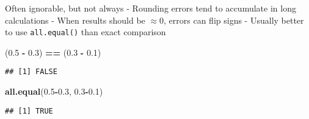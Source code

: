 \documentclass[8pt,ignorenonframetext,]{beamer}
\newenvironment{Shaded}{\begin{snugshade}}{\end{snugshade}}
\newcommand{\KeywordTok}[1]{\textcolor[rgb]{0.13,0.29,0.53}{\textbf{#1}}}
\newcommand{\FloatTok}[1]{\textcolor[rgb]{0.00,0.00,0.81}{#1}}
\newcommand{\StringTok}[1]{\textcolor[rgb]{0.31,0.60,0.02}{#1}}
\newcommand{\OperatorTok}[1]{\textcolor[rgb]{0.81,0.36,0.00}{\textbf{#1}}}
\newcommand{\NormalTok}[1]{#1}
\begin{document}
\begin{frame}[fragile]{}

Often ignorable, but not always - Rounding errors tend to accumulate in
long calculations - When results should be \(\approx 0\), errors can
flip signs - Usually better to use \texttt{all.equal()} than exact
comparison

\begin{Shaded}
\begin{Highlighting}[]
\NormalTok{(}\FloatTok{0.5} \OperatorTok{-}\StringTok{ }\FloatTok{0.3}\NormalTok{) }\OperatorTok{==}\StringTok{ }\NormalTok{(}\FloatTok{0.3} \OperatorTok{-}\StringTok{ }\FloatTok{0.1}\NormalTok{)}
\end{Highlighting}
\end{Shaded}

\begin{verbatim}
## [1] FALSE
\end{verbatim}

\begin{Shaded}
\begin{Highlighting}[]
\KeywordTok{all.equal}\NormalTok{(}\FloatTok{0.5}\OperatorTok{-}\FloatTok{0.3}\NormalTok{, }\FloatTok{0.3}\OperatorTok{-}\FloatTok{0.1}\NormalTok{)}
\end{Highlighting}
\end{Shaded}

\begin{verbatim}
## [1] TRUE
\end{verbatim}

\end{frame}
\end{document}
